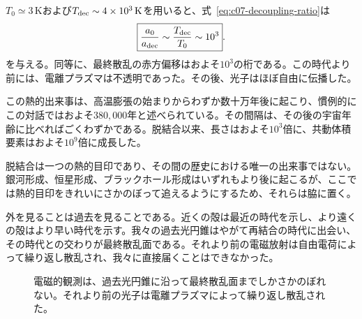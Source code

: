\(T_0\simeq3\,\mathrm{K}\)および\(T_{\rm dec}\sim4\times10^3\,\mathrm{K}\)を用いると、式~\eqref{eq:c07-decoupling-ratio}は
\begin{equation}
\boxed{
\frac{a_0}{a_{\rm dec}}
\sim
\frac{T_{\rm dec}}{T_0}
\sim10^3
}.
\label{eq:c07-decoupling-expansion}
\end{equation}
を与える。同等に、最終散乱の赤方偏移はおよそ\(10^3\)の桁である。この時代より前には、電離プラズマは不透明であった。その後、光子はほぼ自由に伝播した。

この熱的出来事は、高温膨張の始まりからわずか数十万年後に起こり、慣例的にこの対話ではおよそ\(380{,}000\)年と述べられている。その間隔は、その後の宇宙年齢に比べればごくわずかである。脱結合以来、長さはおよそ\(10^3\)倍に、共動体積要素はおよそ\(10^9\)倍に成長した。

脱結合は一つの熱的目印であり、その間の歴史における唯一の出来事ではない。銀河形成、恒星形成、ブラックホール形成はいずれもより後に起こるが、ここでは熱的目印をきれいにさかのぼって追えるようにするため、それらは脇に置く。

外を見ることは過去を見ることである。近くの殻は最近の時代を示し、より遠くの殻はより早い時代を示す。我々の過去光円錐はやがて再結合の時代に出会い、その時代との交わりが最終散乱面である。それより前の電磁放射は自由電荷によって繰り返し散乱され、我々に直接届くことはできなかった。

\begin{figure}[htbp]
\centering
\begin{coursefitfigure}
\end{coursefitfigure}
\caption{電磁的観測は、過去光円錐に沿って最終散乱面までしかさかのぼれない。それより前の光子は電離プラズマによって繰り返し散乱された。}
\label{fig:c07-last-scattering}
\end{figure}

\begin{classroomqa}
\end{classroomqa}

